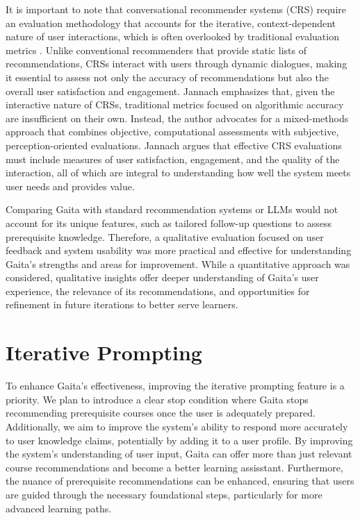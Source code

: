 It is important to note that conversational recommender systems (CRS) require an evaluation methodology that accounts for the iterative, context-dependent nature of user interactions, which is often overlooked by traditional evaluation metrics \cite{jannach_evaluating_2023}. Unlike conventional recommenders that provide static lists of recommendations, CRSs interact with users through dynamic dialogues, making it essential to assess not only the accuracy of recommendations but also the overall user satisfaction and engagement. Jannach emphasizes that, given the interactive nature of CRSs, traditional metrics focused on algorithmic accuracy are insufficient on their own. Instead, the author advocates for a mixed-methods approach that combines objective, computational assessments with subjective, perception-oriented evaluations. Jannach argues that effective CRS evaluations must include measures of user satisfaction, engagement, and the quality of the interaction, all of which are integral to understanding how well the system meets user needs and provides value.

Comparing Gaita with standard recommendation systems or LLMs would not account for its unique features, such as tailored follow-up questions to assess prerequisite knowledge. Therefore, a qualitative evaluation focused on user feedback and system usability was more practical and effective for understanding Gaita’s strengths and areas for improvement. While a quantitative approach was considered, qualitative insights offer deeper understanding of Gaita’s user experience, the relevance of its recommendations, and opportunities for refinement in future iterations to better serve learners.

\section{Iterative Prompting}

To enhance Gaita’s effectiveness, improving the iterative prompting feature is a priority. We plan to introduce a clear stop condition where Gaita stops recommending prerequisite courses once the user is adequately prepared. Additionally, we aim to improve the system’s ability to respond more accurately to user knowledge claims, potentially by adding it to a user profile. By improving the system’s understanding of user input, Gaita can offer more than just relevant course recommendations and become a better learning assisstant. Furthermore, the nuance of prerequisite recommendations can be enhanced, ensuring that users are guided through the necessary foundational steps, particularly for more advanced learning paths. 

